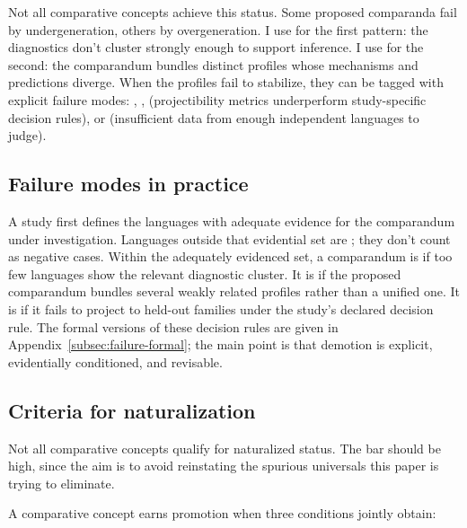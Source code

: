 \documentclass[12pt]{article}
\begin{document}
Not all comparative concepts achieve this status. Some proposed comparanda fail by undergeneration, others by overgeneration. I use  for the first pattern: the diagnostics don't cluster strongly enough to support inference. I use  for the second: the comparandum bundles distinct profiles whose mechanisms and predictions diverge. When the profiles fail to stabilize, they can be tagged with explicit failure modes: , ,  (projectibility metrics underperform study-specific decision rules), or  (insufficient data from enough independent languages to judge).

\subsection{Failure modes in practice}

A study first defines the languages with adequate evidence for the comparandum under investigation. Languages outside that evidential set are ; they don't count as negative cases. Within the adequately evidenced set, a comparandum is  if too few languages show the relevant diagnostic cluster. It is  if the proposed comparandum bundles several weakly related profiles rather than a unified one. It is  if it fails to project to held-out families under the study's declared decision rule. The formal versions of these decision rules are given in Appendix~\ref{subsec:failure-formal}; the main point is that demotion is explicit, evidentially conditioned, and revisable.

\subsection{Criteria for naturalization}\label{subsec:naturalization-criteria}
Not all comparative concepts qualify for naturalized status. The bar should be high, since the aim is to avoid reinstating the spurious universals this paper is trying to eliminate.

A comparative concept earns promotion when three conditions jointly obtain:
\end{document}
